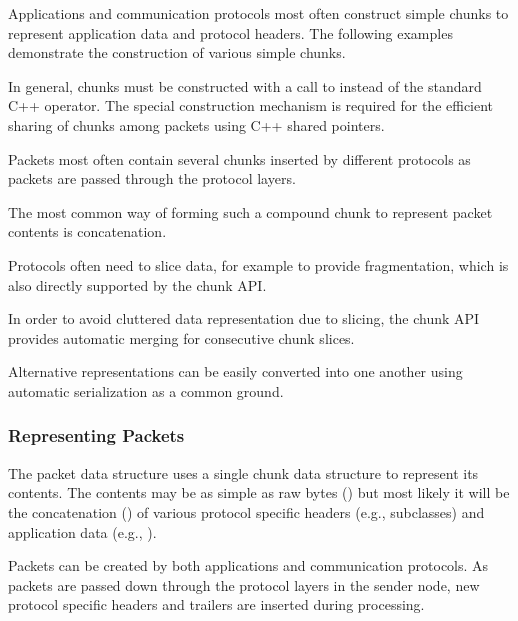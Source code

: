 Applications and communication protocols most often construct simple chunks to represent application data and protocol headers. The following examples demonstrate the construction of various simple chunks.


In general, chunks must be constructed with a call to  instead of the standard  C++ operator. The special construction mechanism is required for the efficient sharing of chunks among packets using C++ shared pointers.

Packets most often contain several chunks inserted by different protocols as packets are passed through the protocol layers.

The most common way of forming such a compound chunk to represent packet contents is concatenation.


Protocols often need to slice data, for example to provide fragmentation, which is also directly supported by the chunk API.


In order to avoid cluttered data representation due to slicing, the chunk API provides automatic merging for consecutive chunk slices.


Alternative representations can be easily converted into one another using automatic serialization as a common ground.



\subsubsection*{Representing Packets}
The packet data structure uses a single chunk data structure to represent its contents. The contents may be as simple as raw bytes () but most likely it will be the concatenation () of various protocol specific headers (e.g.,  subclasses) and application data (e.g., ).

Packets can be created by both applications and communication protocols. As packets are passed down through the protocol layers in the sender node, new protocol specific headers and trailers are inserted during processing.

